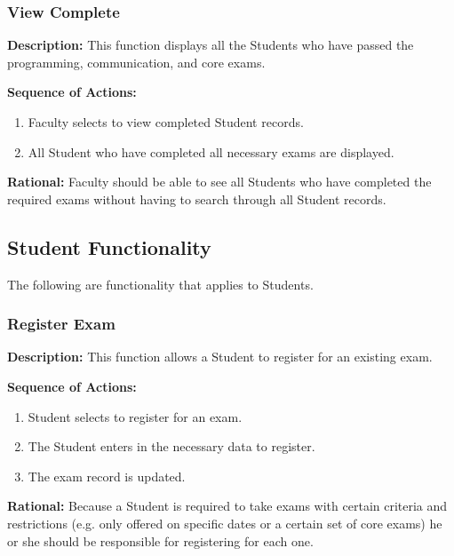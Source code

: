    \subsubsection{\large View Complete}  
   \begin{boxed} %
      \textbf{Description:}
      This function displays all the Students who have passed the
         programming, communication, and core exams. 
         
         \vspace{3mm}
         \textbf{Sequence of Actions:}
         \begin{enumerate}
               
            \item Faculty selects to view completed Student records.
            \item All Student who have completed all necessary exams are
               displayed.
      \end{enumerate}

         \textbf{Rational:}
         Faculty should be able to see all Students who have completed the
         required exams without having to search through all Student records.
   \end{boxed} %


\subsection{Student Functionality}
The following are functionality that applies to Students.

\subsubsection{\large Register Exam} 
\begin{boxed} %
   \textbf{Description:}
   This function allows a Student to register for an existing exam.
         
   \vspace{3mm}
         \textbf{Sequence of Actions:}
         \begin{enumerate}
               
            \item Student selects to register for an exam.
            \item The Student enters in the necessary data to register.
            \item The exam record is updated.
         \end{enumerate}

         \textbf{Rational:}
         Because a Student is required to take exams with certain criteria and
         restrictions (e.g. only offered on specific dates or a certain set of
         core exams) he or she should be responsible for registering for each
      one.
   \end{boxed} %

